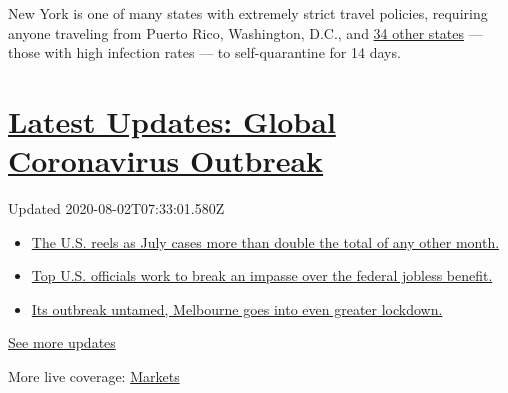 New York is one of many states with extremely strict travel policies,
requiring anyone traveling from Puerto Rico, Washington, D.C., and
\href{https://coronavirus.health.ny.gov/covid-19-travel-advisory}{34
other states} --- those with high infection rates --- to self-quarantine
for 14 days.

\hypertarget{latest-updates-global-coronavirus-outbreak}{%
\section{\texorpdfstring{\href{https://www.nytimes.com/2020/08/01/world/coronavirus-covid-19.html?action=click\&pgtype=Article\&state=default\&region=MAIN_CONTENT_1\&context=storylines_live_updates}{Latest
Updates: Global Coronavirus
Outbreak}}{Latest Updates: Global Coronavirus Outbreak}}\label{latest-updates-global-coronavirus-outbreak}}

Updated 2020-08-02T07:33:01.580Z

\begin{itemize}
\tightlist
\item
  \href{https://www.nytimes.com/2020/08/01/world/coronavirus-covid-19.html?action=click\&pgtype=Article\&state=default\&region=MAIN_CONTENT_1\&context=storylines_live_updates\#link-34047410}{The
  U.S. reels as July cases more than double the total of any other
  month.}
\item
  \href{https://www.nytimes.com/2020/08/01/world/coronavirus-covid-19.html?action=click\&pgtype=Article\&state=default\&region=MAIN_CONTENT_1\&context=storylines_live_updates\#link-780ec966}{Top
  U.S. officials work to break an impasse over the federal jobless
  benefit.}
\item
  \href{https://www.nytimes.com/2020/08/01/world/coronavirus-covid-19.html?action=click\&pgtype=Article\&state=default\&region=MAIN_CONTENT_1\&context=storylines_live_updates\#link-2bc8948}{Its
  outbreak untamed, Melbourne goes into even greater lockdown.}
\end{itemize}

\href{https://www.nytimes.com/2020/08/01/world/coronavirus-covid-19.html?action=click\&pgtype=Article\&state=default\&region=MAIN_CONTENT_1\&context=storylines_live_updates}{See
more updates}

More live coverage:
\href{https://www.nytimes.com/live/2020/07/31/business/stock-market-today-coronavirus?action=click\&pgtype=Article\&state=default\&region=MAIN_CONTENT_1\&context=storylines_live_updates}{Markets}

